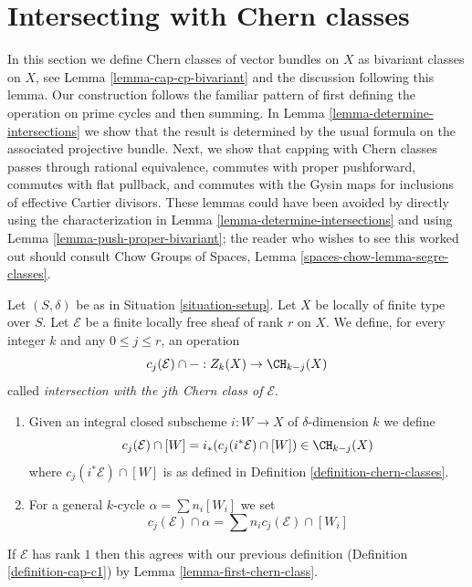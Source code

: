 \section{Intersecting with Chern classes}
\label{section-intersecting-chern-classes}

\noindent
In this section we define Chern classes of vector bundles on $X$ as
bivariant classes on $X$, see Lemma \ref{lemma-cap-cp-bivariant}
and the discussion following this lemma. Our construction follows the familiar
pattern of first defining the operation on prime cycles and then
summing. In Lemma \ref{lemma-determine-intersections} we show
that the result is determined by the usual formula on the associated
projective bundle. Next, we show that capping with Chern classes
passes through rational equivalence, commutes with proper pushforward,
commutes with flat pullback, and commutes with the Gysin maps for
inclusions of effective Cartier divisors. These lemmas could have been
avoided by directly using the characterization in
Lemma \ref{lemma-determine-intersections} and using
Lemma \ref{lemma-push-proper-bivariant}; the reader who wishes to
see this worked out should consult
Chow Groups of Spaces, Lemma \ref{spaces-chow-lemma-segre-classes}.

\begin{definition}
\label{definition-cap-chern-classes}
Let $(S, \delta)$ be as in Situation \ref{situation-setup}.
Let $X$ be locally of finite type over $S$.
Let $\mathcal{E}$ be a finite locally free sheaf of rank $r$ on $X$.
We define, for every integer $k$ and any $0 \leq j \leq r$,
an operation
$$
c_j(\mathcal{E}) \cap - : Z_k(X) \to \CH_{k - j}(X)
$$
called {\it intersection with the $j$th Chern class of $\mathcal{E}$}.
\begin{enumerate}
\item Given an integral closed subscheme $i : W \to X$ of $\delta$-dimension
$k$ we define
$$
c_j(\mathcal{E}) \cap [W] = i_*(c_j({i^*\mathcal{E}}) \cap [W])
\in
\CH_{k - j}(X)
$$
where $c_j({i^*\mathcal{E}}) \cap [W]$ is as defined in
Definition \ref{definition-chern-classes}.
\item For a general $k$-cycle $\alpha = \sum n_i [W_i]$ we set
$$
c_j(\mathcal{E}) \cap \alpha = \sum n_i c_j(\mathcal{E}) \cap [W_i]
$$
\end{enumerate}
\end{definition}

\noindent
If $\mathcal{E}$ has rank $1$ then this agrees with our
previous definition (Definition \ref{definition-cap-c1})
by Lemma \ref{lemma-first-chern-class}.

